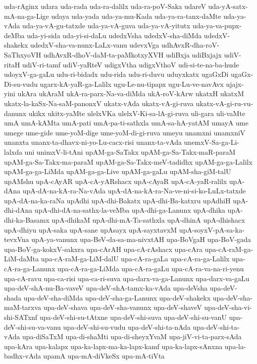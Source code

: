 {uda-rAginx
udara
uda-rada
uda-ra-dalilx
uda-ra-poV-Saka
udareV
uda-yA-satx-mA-na-ga-Lige
udaya
uda-yada
uda-ya-mu-Kada
uda-ya-ra-tanx-daMte
uda-ya-vAda
uda-ya-vA-gu-tatxde
uda-ya-vA-guva
uda-ya-vA-yitutx
uda-ya-va-pupx-deMba
uda-yi-sida
uda-yi-si-daLu
udedxVsha
udedxV-sha-diMda
udedxV-shakekx
udedxV-sha-va-nunx-LaLx-vanu
udevxVga
udhAvxR-dha-roV-SaThxyoVH
udhAvxR-dhoV-daM-ta-paMkotxyXVH
udiBxja
udiBxjajx
udiV-ritaH
udiV-ri-tamf
udiV-yaRteV
udigxVtha
udigxVthoV
udi-si-te-na-ba-hude
udoyxV-ga-gaLu
udu-ri-bidadx
udu-rida
udu-ri-duvu
uduyxkatx
ugaGxDi
ugaGx-Di-su-vudu
ugarx-kA-yaR-ga-Lalilx
ugu-Le-nu-tipapx
ugu-Lu-ve-navAvx
ujajx-yini
ukAra
ukAraM
ukA-ra-parx-Na-va-diMda
ukA-roV-kArw
ukatxH
ukatxM
ukatx-la-kaSx-Na-saM-panonxV
ukatx-vAda
ukatx-vA-gi-ruva
ukatx-vA-gi-ru-vu-danunx
ukikx
ukitx-yaMte
ulelxVKa
ulelxV-Ki-sa-lA-gi-ruva
uli-gara
uli-vaMte
umA
umA-kAMta
umA-pati
umA-pa-ti-sathxla
umA-sa-hA-yatAM
umayA
ume
umege
ume-gide
ume-yoM-dige
ume-yoM-di-gi-ruva
umeyu
unamxni
unamxniV
unanxta
unanx-ta-dhavx-ni-yo-Lu-cacx-risi
unanx-ta-vAda
unemxV-Sa-ga-Li-lalxda
uni
unimxV-li-tAni
upAM-ga-SaTakx
upAM-ga-Sa-Takx-maR-paraM
upAM-ga-Sa-Takx-ma-paraM
upAM-ga-Sa-Takx-meV-tadidhx
upAM-ga-ga-Lalilx
upAM-ga-ga-LiMda
upAM-ga-ga-Live
upAM-ga-gaLu
upAM-sha-giM-talU
upAMshu
upA-cAyAR
upA-cA-yARshacx
upA-cAyaR
upA-cA-yaR-ralilx
upA-dAna
upA-dA-na-kA-ra-Na-vAda
upA-dA-na-kA-ra-Na-ve-ni-si-ko-LuLx-tatxde
upA-dA-na-ka-raNa
upAdhi
upA-dhi-Bakatx
upA-dhi-Ba-katxru
upAdhiH
upA-dhi-dAna
upA-dhi-dA-na-sathx-la-veMba
upA-dhi-ga-Lanunx
upA-dhika
upA-dhi-ka-Basamx
upA-dhikaM
upA-dhi-mA-Ta-sathxla
upA-dhinA
upA-dhishacx
upA-dhiyu
upA-saka
upA-sane
upAsayx
upA-sayxtavxM
upA-soyxV-pA-sa-ka-tevxVna
upA-ya-vanunx
upa-BeV-da-sa-ma-nivxtAH
upa-BoVgaH
upa-BoV-gada
upa-BoV-ga-kokxV-sakxra
upa-cArAH
upa-cA-rAshacx
upa-cAra
upa-cA-raM-ga-LiM-daMta
upa-cA-raM-ga-LiM-dalU
upa-cA-ra-gaLa
upa-cA-ra-ga-Lalilx
upa-cA-ra-ga-Lanunx
upa-cA-ra-ga-LiMda
upa-cA-ra-gaLu
upa-cA-ra-va-na-ri-yenu
upa-cA-ravu
upa-ca-risi
upa-ca-ri-suva
upa-darx-va-ga-Lanunx
upa-darx-va-gaLu
upa-deV-shA-nu-Ba-vaveV
upa-deV-shA-tamx-ka-vAda
upa-deVsha
upa-deV-shada
upa-deV-sha-diMda
upa-deV-sha-ga-Lanunx
upa-deV-shakekx
upa-deV-sha-maM-tarxva
upa-deV-shava
upa-deV-sha-vanunx
upa-deV-shaveV
upa-deV-sha-vi-shi-SATxnf
upa-deV-shi-su-tAtxne
upa-deV-shi-suva
upa-deV-shi-su-vanU
upa-deV-shi-su-va-vanu
upa-deV-shi-su-vudu
upa-deV-shi-ta-nAda
upa-deV-shi-ta-vAda
upa-diSaTxM
upa-di-shaMti
upa-di-sheyxYvaM
upa-jiV-vi-ta-parx-sAda
upa-kAra
upa-kalapx
upa-ka-lapx-ma-ka-lapx-kamf
upa-ka-lapx-sAnxna
upa-la-badhx-vAda
upamA
upa-mA-diVkeSx
upa-mA-tiVta
}
